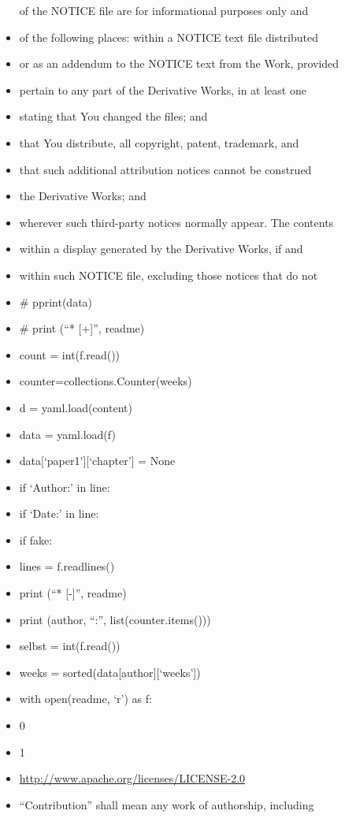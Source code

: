 \begin{itemize}
  of the NOTICE file are for informational purposes only and
\item
  of the following places: within a NOTICE text file distributed
\item
  or as an addendum to the NOTICE text from the Work, provided
\item
  pertain to any part of the Derivative Works, in at least one
\item
  stating that You changed the files; and
\item
  that You distribute, all copyright, patent, trademark, and
\item
  that such additional attribution notices cannot be construed
\item
  the Derivative Works; and
\item
  wherever such third-party notices normally appear. The contents
\item
  within a display generated by the Derivative Works, if and
\item
  within such NOTICE file, excluding those notices that do not
\item
  \# pprint(data)
\item
  \# print (``* {[}+{]}'', readme)
\item
  count = int(f.read())
\item
  counter=collections.Counter(weeks)
\item
  d = yaml.load(content)
\item
  data = yaml.load(f)
\item
  data{[}`paper1'{]}{[}`chapter'{]} = None
\item
  if `Author:' in line:
\item
  if `Date:' in line:
\item
  if fake:
\item
  lines = f.readlines()
\item
  print (``* {[}-{]}'', readme)
\item
  print (author, ``:'', list(counter.items()))
\item
  selbst = int(f.read())
\item
  weeks = sorted(data{[}author{]}{[}`weeks'{]})
\item
  with open(readme, `r') as f:
\item
  0
\item
  1
\item
  \url{http://www.apache.org/licenses/LICENSE-2.0}
\item
  ``Contribution'' shall mean any work of authorship, including

\end{itemize}
